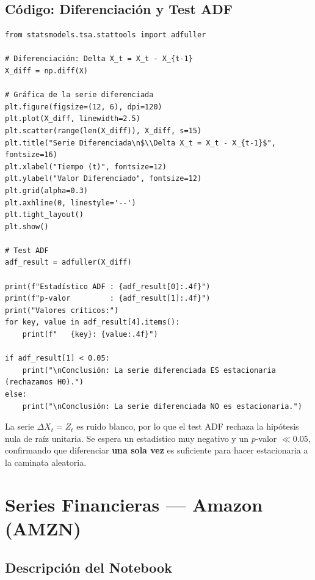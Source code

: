 \documentclass[12pt, a4paper]{article}
\begin{document}
\subsection{Código: Diferenciación y Test ADF}

\begin{lstlisting}[caption={Diferenciación y Test ADF sobre la caminata aleatoria}]
from statsmodels.tsa.stattools import adfuller

# Diferenciación: Delta X_t = X_t - X_{t-1}
X_diff = np.diff(X)

# Gráfica de la serie diferenciada
plt.figure(figsize=(12, 6), dpi=120)
plt.plot(X_diff, linewidth=2.5)
plt.scatter(range(len(X_diff)), X_diff, s=15)
plt.title("Serie Diferenciada\n$\\Delta X_t = X_t - X_{t-1}$", fontsize=16)
plt.xlabel("Tiempo (t)", fontsize=12)
plt.ylabel("Valor Diferenciado", fontsize=12)
plt.grid(alpha=0.3)
plt.axhline(0, linestyle='--')
plt.tight_layout()
plt.show()

# Test ADF
adf_result = adfuller(X_diff)

print(f"Estadístico ADF : {adf_result[0]:.4f}")
print(f"p-valor         : {adf_result[1]:.4f}")
print("Valores críticos:")
for key, value in adf_result[4].items():
    print(f"   {key}: {value:.4f}")

if adf_result[1] < 0.05:
    print("\nConclusión: La serie diferenciada ES estacionaria (rechazamos H0).")
else:
    print("\nConclusión: La serie diferenciada NO es estacionaria.")
\end{lstlisting}

\begin{resultado}
  La serie $\Delta X_t = Z_t$ es ruido blanco, por lo que el test ADF rechaza
  la hipótesis nula de raíz unitaria. Se espera un estadístico muy negativo y
  un $p$-valor $\ll 0.05$, confirmando que diferenciar \textbf{una sola vez}
  es suficiente para hacer estacionaria a la caminata aleatoria.
\end{resultado}

\newpage

\section{Series Financieras — Amazon (AMZN)}

\subsection{Descripción del Notebook}
\end{document}
